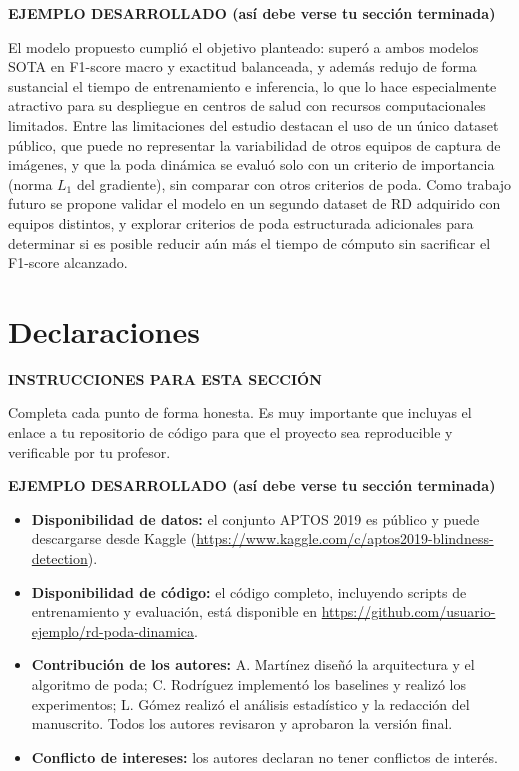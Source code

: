 \documentclass[pdflatex,sn-mathphys-num]{sn-jnl}
\newenvironment{instruccion}{%
  \par\noindent\textbf{\color{blue!55!black}INSTRUCCIONES PARA ESTA SECCIÓN}%
  \par\vspace{2pt}\noindent\itshape\small
}{%
  \par\normalfont\vspace{6pt}
}
\newenvironment{ejemplo}{%
  \par\noindent\textbf{\color{green!35!black}EJEMPLO DESARROLLADO (así debe verse tu sección terminada)}%
  \par\vspace{2pt}\noindent\small
}{%
  \par\normalfont\vspace{6pt}
}
\begin{document}
\begin{ejemplo}
El modelo propuesto cumplió el objetivo planteado: superó a ambos modelos SOTA en F1-score macro y exactitud balanceada, y además redujo de forma sustancial el tiempo de entrenamiento e inferencia, lo que lo hace especialmente atractivo para su despliegue en centros de salud con recursos computacionales limitados. Entre las limitaciones del estudio destacan el uso de un único dataset público, que puede no representar la variabilidad de otros equipos de captura de imágenes, y que la poda dinámica se evaluó solo con un criterio de importancia (norma $L_1$ del gradiente), sin comparar con otros criterios de poda. Como trabajo futuro se propone validar el modelo en un segundo dataset de RD adquirido con equipos distintos, y explorar criterios de poda estructurada adicionales para determinar si es posible reducir aún más el tiempo de cómputo sin sacrificar el F1-score alcanzado.
\end{ejemplo}

\backmatter

\section*{Declaraciones}

\begin{instruccion}
Completa cada punto de forma honesta. Es muy importante que incluyas el enlace a tu repositorio de código para que el proyecto sea reproducible y verificable por tu profesor.
\end{instruccion}

\begin{ejemplo}
\begin{itemize}
\item \textbf{Disponibilidad de datos:} el conjunto APTOS 2019 es público y puede descargarse desde Kaggle (\url{https://www.kaggle.com/c/aptos2019-blindness-detection}).
\item \textbf{Disponibilidad de código:} el código completo, incluyendo scripts de entrenamiento y evaluación, está disponible en \url{https://github.com/usuario-ejemplo/rd-poda-dinamica}.
\item \textbf{Contribución de los autores:} A. Martínez diseñó la arquitectura y el algoritmo de poda; C. Rodríguez implementó los baselines y realizó los experimentos; L. Gómez realizó el análisis estadístico y la redacción del manuscrito. Todos los autores revisaron y aprobaron la versión final.
\item \textbf{Conflicto de intereses:} los autores declaran no tener conflictos de interés.
\end{itemize}
\end{ejemplo}
\end{document}
